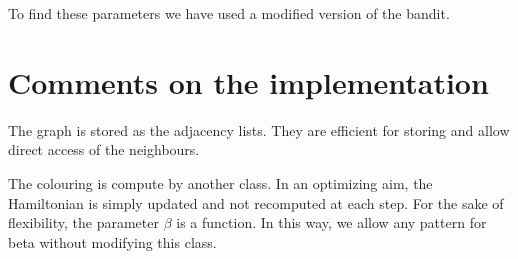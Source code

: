 \documentclass[a4paper, 11pt]{article}
\begin{document}
To find these parameters we have used a modified version of the bandit. 


\section{Comments on the implementation}

The graph is stored as the adjacency lists. They are efficient for storing and allow direct access of the neighbours.

The colouring is compute by another class. In an optimizing aim, the Hamiltonian is simply updated and not recomputed at each step. For the sake of flexibility, the parameter $\beta$ is a function. In this way, we allow any pattern for beta without modifying this class.



\end{document}
